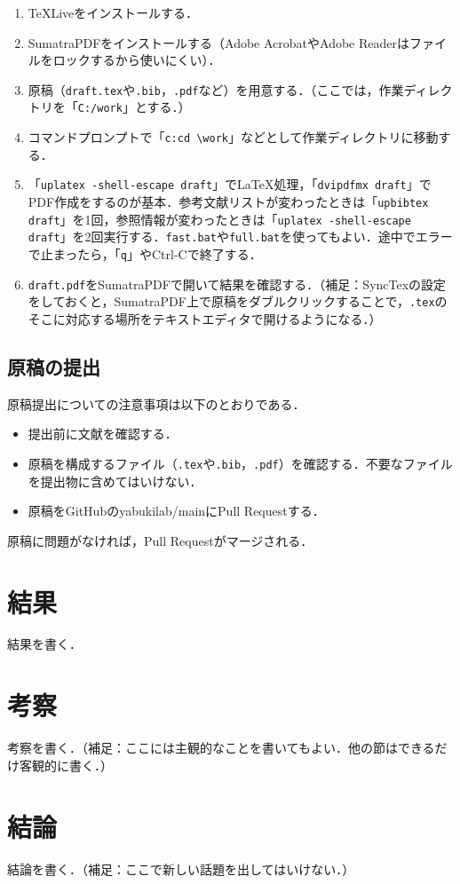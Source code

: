 \documentclass[uplatex,twocolumn,dvipdfmx]{jsarticle}
\begin{document}
\begin{enumerate}
\item TeXLiveをインストールする．
\item SumatraPDFをインストールする（Adobe AcrobatやAdobe Readerはファイルをロックするから使いにくい）．
\item 原稿（\verb|draft.tex|や\verb|.bib|，\verb|.pdf|など）を用意する．（ここでは，作業ディレクトリを「\verb|C:/work|」とする．）
\item コマンドプロンプトで「\verb|c:|\verb|cd \work|」などとして作業ディレクトリに移動する．
\item 「\verb|uplatex -shell-escape draft|」で\LaTeX 処理，「\verb|dvipdfmx draft|」でPDF作成をするのが基本．参考文献リストが変わったときは「\verb|upbibtex draft|」を1回，参照情報が変わったときは「\verb|uplatex -shell-escape draft|」を2回実行する．\verb|fast.bat|や\verb|full.bat|を使ってもよい．途中でエラーで止まったら，「\verb|q|」やCtrl-Cで終了する．
\item \verb|draft.pdf|をSumatraPDFで開いて結果を確認する．（補足：SyncTexの設定をしておくと，SumatraPDF上で原稿をダブルクリックすることで，\verb|.tex|のそこに対応する場所をテキストエディタで開けるようになる．）
\end{enumerate}

\subsection{原稿の提出}

原稿提出についての注意事項は以下のとおりである．

\begin{itemize}
\item 提出前に文献\cite{文章チェックリスト}を確認する．
\item 原稿を構成するファイル（\verb|.tex|や\verb|.bib|，\verb|.pdf|）を確認する．不要なファイルを提出物に含めてはいけない．
\item 原稿をGitHubのyabukilab/mainにPull Requestする．
\end{itemize}

原稿に問題がなければ，Pull Requestがマージされる．

\section{結果}

結果を書く．

\section{考察}

考察を書く．（補足：ここには主観的なことを書いてもよい．他の節はできるだけ客観的に書く．）

\section{結論}

結論を書く．（補足：ここで新しい話題を出してはいけない．）


\end{document}
